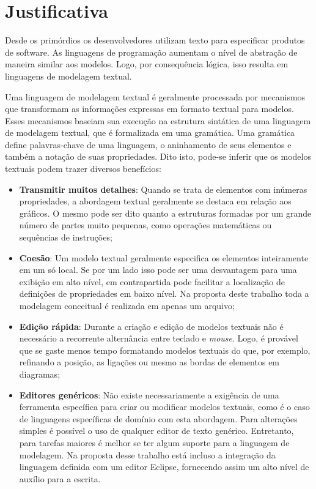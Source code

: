 \section{Justificativa}

Desde os primórdios os desenvolvedores utilizam texto para especificar produtos de software. 
As linguagens de programação aumentam o nível de abstração de maneira similar aos modelos. 
Logo, por consequência lógica, isso resulta em linguagens de modelagem textual.

Uma linguagem de modelagem textual é geralmente processada por mecanismos que transformam as informações expressas em formato textual para modelos. 
Esses mecanismos baseiam sua execução na estrutura sintática de uma linguagem de modelagem textual, que é formalizada em uma gramática. 
Uma gramática define palavras-chave de uma linguagem, o aninhamento de seus elementos e também a notação de suas propriedades. 
Dito isto, pode-se inferir que os modelos textuais podem trazer diversos benefícios:

\begin{itemize}
    \item \textbf{Transmitir muitos detalhes}: Quando se trata de elementos com inúmeras propriedades, a abordagem textual geralmente se destaca em relação aos gráficos. 
    O mesmo pode ser dito quanto a estruturas formadas por um grande número de partes muito pequenas, como operações matemáticas ou sequências de instruções;
    \item \textbf{Coesão}: Um modelo textual geralmente especifica os elementos inteiramente em um só local. 
    Se por um lado isso pode ser uma desvantagem para uma exibição em alto nível, em contrapartida pode facilitar a localização de definições de propriedades em baixo nível. 
    Na proposta deste trabalho toda a modelagem conceitual é realizada em apenas um arquivo;
    \item \textbf{Edição rápida}: Durante a criação e edição de modelos textuais não é necessário a recorrente alternância entre teclado e \textit{mouse}. 
    Logo, é provável que se gaste menos tempo formatando modelos textuais do que, por exemplo, refinando a posição, as ligações ou mesmo as bordas de elementos em diagramas;
    \item \textbf{Editores genéricos}: Não existe necessariamente a exigência de uma ferramenta específica para criar ou modificar modelos textuais, como é o caso de linguagens específicas de domínio com esta abordagem. 
    Para alterações simples é possível o uso de qualquer editor de texto genérico. 
    Entretanto, para tarefas maiores é melhor se ter algum suporte para a linguagem de modelagem. 
    Na proposta desse trabalho está incluso a integração da linguagem definida com um editor Eclipse, fornecendo assim um alto nível de auxílio para a escrita.
\end{itemize}


